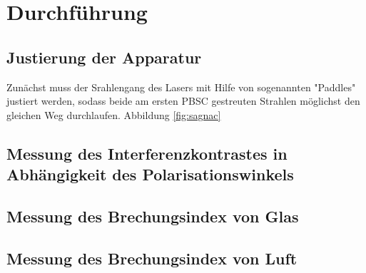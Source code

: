 \section{Durchführung}
\subsection{Justierung der Apparatur}
Zunächst muss der Srahlengang des Lasers mit Hilfe von sogenannten "Paddles" justiert werden,
sodass beide am ersten PBSC gestreuten Strahlen möglichst den gleichen Weg durchlaufen.
Abbildung \ref{fig:sagnac}
\subsection{Messung des Interferenzkontrastes in Abhängigkeit des Polarisationswinkels}
\subsection{Messung des Brechungsindex von Glas}
\subsection{Messung des Brechungsindex von Luft}
